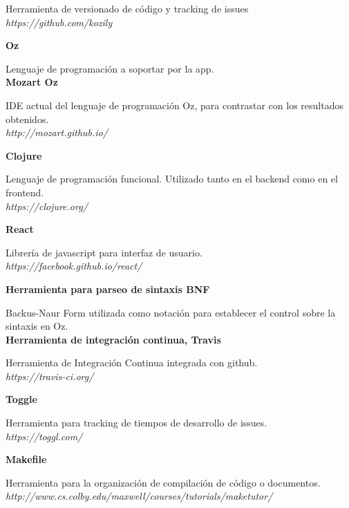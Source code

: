 \documentclass[a4paper,11pt]{article}
\begin{document}
\noindent Herramienta de versionado de código y tracking de issues\\

\noindent \emph{https://github.com/kozily}

\noindent \textbf{Oz}

\noindent Lenguaje de programación a soportar por la app.\\

\noindent \textbf{Mozart Oz}

\noindent IDE actual del lenguaje de programación Oz, para contrastar con los resultados obtenidos.\\

\noindent \emph{http://mozart.github.io/}

\noindent \textbf{Clojure}

\noindent Lenguaje de programación funcional. Utilizado tanto en el backend como en el frontend.\\

\noindent \emph{https://clojure.org/}

\noindent \textbf{React}

\noindent Librería de javascript para interfaz de usuario.\\

\noindent \emph{https://facebook.github.io/react/}

\noindent \textbf{Herramienta para parseo de sintaxis BNF}

\noindent Backus-Naur Form utilizada como notación para establecer el control sobre la sintaxis en Oz.\\

\noindent \textbf{Herramienta de integración continua, Travis}

\noindent Herramienta de Integración Continua integrada con github.\\

\noindent \emph{https://travis-ci.org/}

\noindent \textbf{Toggle}

\noindent Herramienta para tracking de tiempos de desarrollo de issues.\\

\noindent \emph{https://toggl.com/}

\noindent \textbf{Makefile}

\noindent Herramienta para la organización de compilación de código o documentos.\\

\noindent \emph{http://www.cs.colby.edu/maxwell/courses/tutorials/maketutor/}
\end{document}
